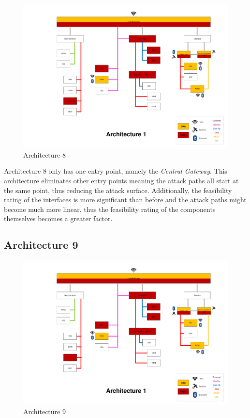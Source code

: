 \begin{figure}[h!]
    \caption{Architecture 8}
    \includegraphics[width=\textwidth, page=8]{../Architectures-survey.pdf}
\end{figure}

Architecture 8 only has one entry point, namely the \textit{Central Gateway}. 
This architecture eliminates other entry points meaning the attack paths all start at the same point, thus reducing the attack surface.
Additionally, the feasibility rating of the interfaces is more significant than before and the attack paths might become much more linear, thus the feasibility rating of the components themselves becomes a greater factor.\par


\subsection*{Architecture 9}
\label{sec:arch9}

\begin{figure}[h!]
    \caption{Architecture 9}
    \includegraphics[width=\textwidth, page=9]{../Architectures-survey.pdf}
\end{figure}

